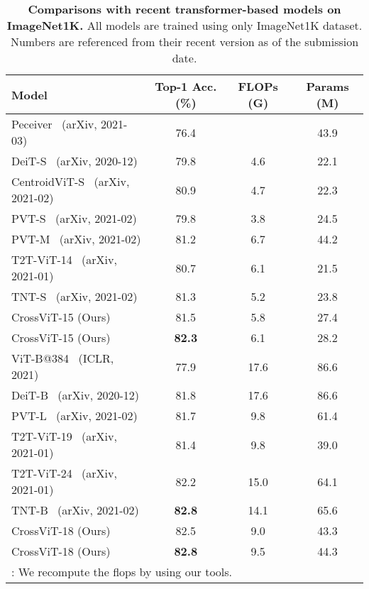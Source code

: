 \documentclass[10pt,twocolumn,letterpaper]{article}
\def\ours{CrossViT\xspace}
\begin{document}
\begin{table}[t]
    \centering
    \begin{adjustbox}{max width=\linewidth}
    \begin{tabular}{l|c|c|c}
        \toprule
             Model   & Top-1 Acc. (\%) & FLOPs (G) & Params (M)  \\ 
        \midrule
            Peceiver~\cite{perceiver_jaegle2021} (arXiv, 2021-03) & 76.4 &  & 43.9 \\
            DeiT-S~\cite{DeiT_touvron2020} (arXiv, 2020-12) & 79.8 & 4.6& 22.1 \\
CentroidViT-S~\cite{centroidvit_wu2021} (arXiv, 2021-02) & 80.9&4.7&22.3 \\
            PVT-S~\cite{PVT_wang2021} (arXiv, 2021-02) &79.8& 3.8&24.5 \\
            PVT-M~\cite{PVT_wang2021} (arXiv, 2021-02) &81.2&6.7&44.2 \\
T2T-ViT-14~\cite{tokenstotoken_yuan2021} (arXiv, 2021-01) & 80.7 & 6.1 & 21.5 \\
            TNT-S~\cite{TNT_han2021transformer} (arXiv, 2021-02) & 81.3& 5.2& 23.8 \\
            \ours-15 (Ours)& 81.5 & 5.8& 27.4 \\
            \ours-15 (Ours) & \textbf{82.3} & 6.1 & 28.2 \\ 
            \midrule
            ViT-B@384~\cite{ViT_dosovitskiy2021an} (ICLR, 2021) & 77.9 & 17.6& 86.6 \\
DeiT-B~\cite{DeiT_touvron2020} (arXiv, 2020-12)& 81.8& 17.6& 86.6 \\
            PVT-L~\cite{PVT_wang2021} (arXiv, 2021-02) &81.7&9.8&61.4 \\
T2T-ViT-19~\cite{tokenstotoken_yuan2021} (arXiv, 2021-01) & 81.4 & 9.8  & 39.0 \\
            T2T-ViT-24~\cite{tokenstotoken_yuan2021} (arXiv, 2021-01) & 82.2 & 15.0  & 64.1 \\
            TNT-B~\cite{TNT_han2021transformer} (arXiv, 2021-02) & \textbf{82.8} & 14.1& 65.6 \\
            \ours-18 (Ours)& 82.5& 9.0 & 43.3 \\ 




            \ours-18 (Ours)& \textbf{82.8} & 9.5 & 44.3 \\ 
\bottomrule
        \multicolumn{4}{l}{\footnotesize : We recompute the flops by using our tools.}
    \end{tabular}
    \end{adjustbox}
\caption{\textbf{Comparisons with recent transformer-based models on ImageNet1K.} All models are trained using only ImageNet1K dataset. Numbers are referenced from their recent version as of the submission date.}
    \label{table:sota}
\end{table}
%
 
\end{document}
